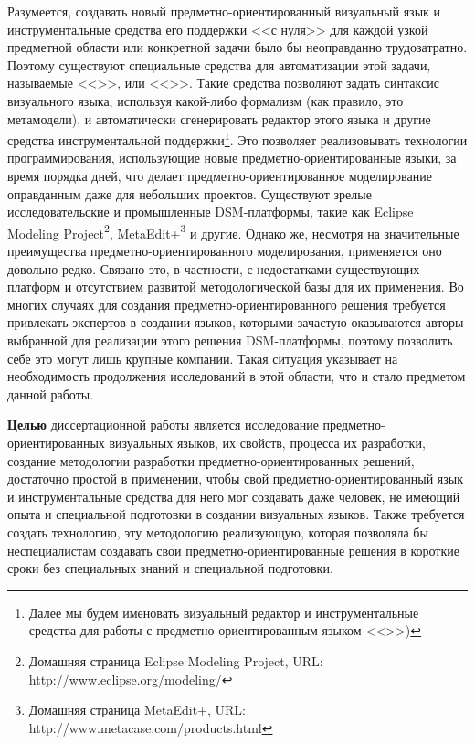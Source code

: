 Разумеется, создавать новый предметно-ориентированный визуальный язык и 
инструментальные средства его поддержки <<с нуля>> для каждой узкой предметной 
области или конкретной задачи было бы неоправданно трудозатратно. Поэтому 
существуют специальные средства для автоматизации этой задачи, называемые 
<<>>, или <<>>. Такие средства позволяют задать 
синтаксис визуального языка, используя какой-либо формализм (как правило, 
это метамодели), и автоматически сгенерировать редактор этого языка и другие средства инструментальной 
поддержки\footnote{Далее мы будем именовать визуальный редактор и инструментальные средства для работы с предметно-ориентированным языком <<>>)}. 
Это позволяет реализовывать технологии программирования, использующие новые предметно-ориентированные языки, за время 
порядка дней, что делает предметно-ориентированное моделирование оправданным 
даже для небольших проектов. Существуют зрелые исследовательские и промышленные 
\ac{DSM}-платформы, такие как Eclipse Modeling 
Project\footnote{Домашняя страница Eclipse Modeling Project, URL: http://www.eclipse.org/modeling/},
MetaEdit+\footnote{Домашняя страница MetaEdit+, URL: http://www.metacase.com/products.html} 
и другие. Однако же, несмотря на значительные преимущества предметно-ориентированного 
моделирования, применяется оно довольно редко. Связано это, в частности, с 
недостатками существующих платформ и отсутствием развитой методологической 
базы для их применения. 
Во многих случаях для создания предметно-ориентированного 
решения требуется привлекать экспертов в создании языков, которыми зачастую 
оказываются авторы выбранной для реализации этого решения \ac{DSM}-платформы, поэтому 
позволить себе это могут лишь крупные компании. Такая ситуация указывает на 
необходимость продолжения исследований в этой области, что и стало предметом 
данной работы.

\textbf{Целью} диссертационной работы является исследование предметно-ориентированных 
визуальных языков, их свойств, процесса их разработки, создание методологии 
разработки предметно-ориентированных решений, достаточно простой в применении, 
чтобы свой предметно-ориентированный язык и инструментальные средства для него 
мог создавать даже человек, не имеющий опыта и специальной подготовки в создании 
визуальных языков. Также требуется создать технологию, эту методологию 
реализующую, которая позволяла бы неспециалистам создавать свои 
предметно-ориентированные решения в короткие сроки без специальных знаний и 
специальной подготовки. 

